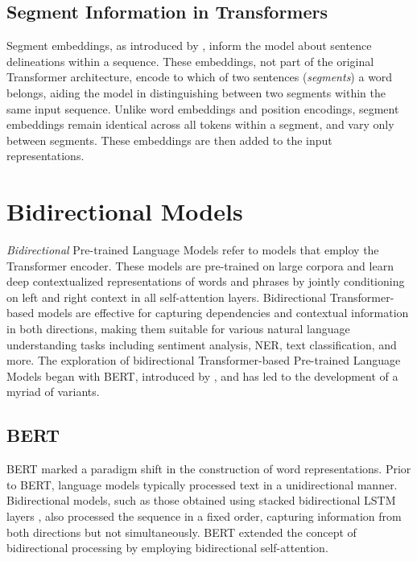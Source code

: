 \subsection{Segment Information in Transformers}

Segment embeddings, as introduced by \citet{devlin2018bert}, inform the model about sentence delineations within a sequence. These embeddings, not part of the original Transformer architecture, encode to which of two sentences (\textit{segments})
a word belongs, aiding the model in distinguishing between two segments within the same input sequence. 
Unlike word embeddings and position encodings, segment embeddings remain identical across all tokens within a segment, and vary only between segments. These embeddings are then added to the input representations.

\section{Bidirectional Models}

\textit{Bidirectional} Pre-trained Language Models refer to models that employ the Transformer encoder. These models are pre-trained on large corpora and learn deep contextualized representations of words and phrases by jointly conditioning on left and right context in all self-attention layers. Bidirectional Transformer-based models are effective for capturing dependencies and contextual information in both directions, making them suitable for various natural language understanding tasks including sentiment analysis, \ac{NER}, text classification, and more. The exploration of bidirectional Transformer-based Pre-trained Language Models began with \ac{BERT}, introduced by \citet{devlin2018bert}, and has led to the development of a myriad of variants.

\subsection{BERT}

\ac{BERT} marked a paradigm shift in the construction of word representations.  
Prior to \ac{BERT}, language models typically processed text in a unidirectional manner. Bidirectional models, such as those obtained using stacked bidirectional \ac{LSTM} layers \citep{peters-etal-2018-deep}, also processed the sequence in a fixed order, capturing information from both directions but not simultaneously. \ac{BERT} extended the concept of bidirectional processing by employing bidirectional self-attention.

